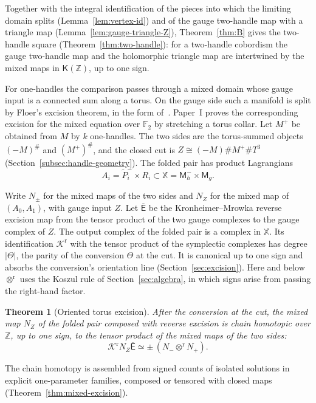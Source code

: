 \documentclass[11pt]{amsart}
\theoremstyle{definition}
\theoremstyle{remark}
\theoremstyle{plain}
\newtheorem{thmletter}{Theorem}
\numberwithin{equation}{section}
\newcommand{\ZZ}{\mathbb Z}
\newcommand{\FF}{\mathbb F_2}
\newcommand{\cK}{\mathsf K}
\newcommand{\Msf}{\mathsf M}
\begin{document}
Together with the integral identification of the pieces into which the limiting domain splits (Lemma~\ref{lem:vertex-id}) and of the gauge two-handle map with a triangle map (Lemma~\ref{lem:gauge-triangle-Z}), Theorem~\ref{thm:B} gives the two-handle square
(Theorem~\ref{thm:two-handle}): for a two-handle cobordism the gauge two-handle map and the
holomorphic triangle map are intertwined by the mixed maps in $\cK(\ZZ)$, up to one sign.

For one-handles the comparison passes through a mixed domain whose gauge input is a connected sum
along a torus. On the gauge side such a manifold is split by Floer's excision theorem, in the form
of~\cite[Theorem~5.6]{KM-unknot}. Paper~I proves the corresponding excision for the mixed
equation over $\FF$ by stretching a torus collar. Let $M^+$ be obtained from $M$ by $k$ one-handles.
The two sides are the torus-summed objects $(-M)^\#$ and $(M^+)^\#$, and the closed cut is
$Z\cong(-M)\#M^+\#T^3$ (Section~\ref{subsec:handle-geometry}). The folded pair
has product Lagrangians
\[
 A_i=\widetilde P_i^-\times R_i\subset\mathbb X=\Msf_h^-\times\Msf_g.
\]

Write $N_\pm$ for the mixed maps of the two sides and $N_Z$ for the mixed
map of $(A_0,A_1)$, with gauge input $Z$. Let $\overline{\mathsf E}$ be the
Kronheimer--Mrowka reverse excision map from the tensor product of the two
gauge complexes to the gauge complex of $Z$. The output complex of the
folded pair is a complex in $\mathbb X$. Its identification
$\mathcal K^{\mathrm r}$ with the tensor product of the symplectic complexes
has degree $|\Theta|$, the parity of the conversion $\Theta$ at the cut.
It is canonical up to one sign and absorbs the conversion's orientation
line (Section~\ref{sec:excision}). Here and below $\otimes^{\mathrm r}$
uses the Koszul rule of Section~\ref{sec:algebra}, in which signs arise
from passing the right-hand factor.

\begin{thmletter}[Oriented torus excision]\label{thm:excision-intro}
After the conversion at the cut, the mixed map $N_Z$ of the folded pair composed with reverse excision is chain homotopic over $\ZZ$, up to one sign, to the tensor product of the mixed maps of
the two sides:
\[
 \mathcal K^{\mathrm r}N_Z\overline{\mathsf E}\simeq\pm\,(N_-\otimes^{\mathrm r}N_+).
\]
\end{thmletter}

The chain homotopy is assembled from signed counts of isolated solutions in explicit
one-parameter families, composed or tensored with closed maps (Theorem~\ref{thm:mixed-excision}).
\end{document}
